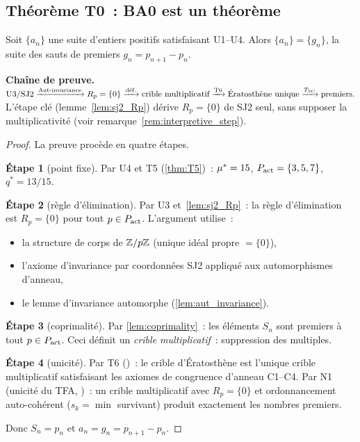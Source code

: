 \documentclass[12pt,a4paper]{article}
\begin{document}
\subsection{Théorème T0~: BA0 est un théorème}
\label{sec:ch25_T0}

\mTHM
\begin{theoreme}
\label{thm:T0}
Soit $\{a_n\}$ une suite d'entiers positifs satisfaisant U1--U4.
Alors $\{a_n\} = \{g_n\}$, la suite des sauts de premiers
$g_n = p_{n+1} - p_n$.

\smallskip\noindent\textbf{Chaîne de preuve.}
$\text{U3/SJ2} \xrightarrow{\text{Aut-invariance}}
R_p = \{0\} \xrightarrow{\text{déf.}}
\text{crible multiplicatif} \xrightarrow{\text{T6}}
\text{Ératosthène unique} \xrightarrow{T_{\rm SC}}
\text{premiers}.$
L'étape clé (lemme~\ref{lem:sj2_Rp}) dérive $R_p = \{0\}$ de SJ2
seul, sans supposer la multiplicativité (voir
remarque~\ref{rem:interpretive_step}).
\end{theoreme}

\begin{proof}
La preuve procède en quatre étapes.

\textbf{Étape 1} (point fixe). Par U4 et T5 (\cref{thm:T5})~:
${\mu^{*}} = 15$, $P_{\rm act} = \{3, 5, 7\}$, $q^* = 13/15$.

\textbf{Étape 2} (règle d'élimination). Par U3 et~\cref{lem:sj2_Rp}~:
la règle d'élimination est $R_p = \{0\}$ pour tout
$p \in P_{\rm act}$. L'argument utilise~:
\begin{itemize}[nosep]
\item la structure de corps de $\mathbb{Z}/p\mathbb{Z}$ (unique idéal propre
  $= \{0\}$),
\item l'axiome d'invariance par coordonnées SJ2 appliqué aux
  automorphismes d'anneau,
\item le lemme d'invariance automorphe (\cref{lem:aut_invariance}).
\end{itemize}

\textbf{Étape 3} (coprimalité). Par \cref{lem:coprimality}~: les
éléments $S_n$ sont premiers à tout $p \in P_{\rm act}$. Ceci
définit un \emph{crible multiplicatif}~: suppression des multiples.

\textbf{Étape 4} (unicité). Par T6 (\cite{companion_M1})~:
le crible d'Ératosthène est l'unique crible multiplicatif
satisfaisant les axiomes de congruence d'anneau C1--C4. Par N1
(unicité du TFA, \cite{companion_M1})~: un crible multiplicatif avec
$R_p = \{0\}$ et ordonnancement auto-cohérent ($s_k = \min$
survivant) produit exactement les nombres premiers.

Donc $S_n = p_n$ et $a_n = g_n = p_{n+1} - p_n$.
\end{proof}
\end{document}
